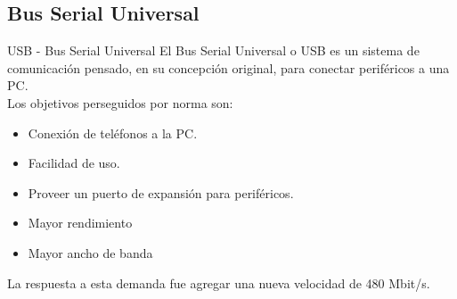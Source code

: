 \documentclass[11pt,a4paper]{beamer}
\begin{document}
		\subsection{Bus Serial Universal}
			\begin{frame}{USB - Bus Serial Universal}
					El Bus Serial Universal o USB es un sistema de comunicación pensado, en su concepción original, para conectar periféricos a una PC.\\
					Los objetivos perseguidos por norma son:

				\begin{itemize}
					\item Conexión de teléfonos a la PC.
					\item Facilidad de uso.
					\item Proveer un puerto de expansión para periféricos.
					\item<2-> \alert {Mayor rendimiento}
					\item<2-> \alert {Mayor ancho de banda}
				\end{itemize}
				
				 {La respuesta a esta demanda fue agregar una nueva velocidad de 480 Mbit/s.}
				
			\end{frame}
\end{document}
